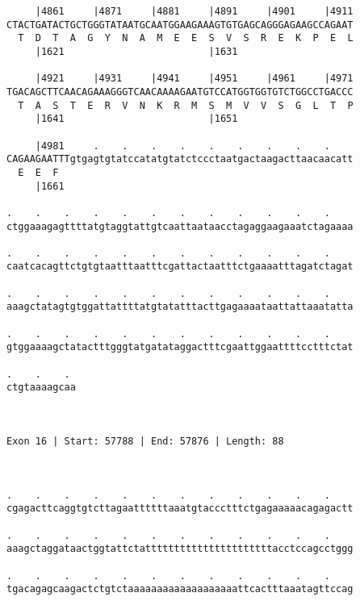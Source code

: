 \documentclass{article}
\begin{document}
\begin{Verbatim}
     |4861     |4871     |4881     |4891     |4901     |4911
CTACTGATACTGCTGGGTATAATGCAATGGAAGAAAGTGTGAGCAGGGAGAAGCCAGAAT
  T  D  T  A  G  Y  N  A  M  E  E  S  V  S  R  E  K  P  E  L
     |1621                         |1631                    
  
     |4921     |4931     |4941     |4951     |4961     |4971
TGACAGCTTCAACAGAAAGGGTCAACAAAAGAATGTCCATGGTGGTGTCTGGCCTGACCC
  T  A  S  T  E  R  V  N  K  R  M  S  M  V  V  S  G  L  T  P
     |1641                         |1651                    
  
     |4981     .    .    .    .    .    .    .    .    .    
CAGAAGAATTTgtgagtgtatccatatgtatctccctaatgactaagacttaacaacatt
  E  E  F                                                   
     |1661                                                  
  
.    .    .    .    .    .    .    .    .    .    .    .    
ctggaaagagttttatgtaggtattgtcaattaataacctagaggaagaaatctagaaaa
                                                            
.    .    .    .    .    .    .    .    .    .    .    .    
caatcacagttctgtgtaatttaatttcgattactaatttctgaaaatttagatctagat
                                                            
.    .    .    .    .    .    .    .    .    .    .    .    
aaagctatagtgtggattattttatgtatatttacttgagaaaataattattaaatatta
                                                            
.    .    .    .    .    .    .    .    .    .    .    .    
gtggaaaagctatactttgggtatgatataggactttcgaattggaattttcctttctat
                                                            
.    .    . 
ctgtaaaagcaa
            
            
 
Exon 16 | Start: 57788 | End: 57876 | Length: 88



.    .    .    .    .    .    .    .    .    .    .    .    
cgagacttcaggtgtcttagaattttttaaatgtaccctttctgagaaaaacagagactt
                                                            
.    .    .    .    .    .    .    .    .    .    .    .    
aaagctaggataactggtattctattttttttttttttttttttttacctccagcctggg
                                                            
.    .    .    .    .    .    .    .    .    .    .    .    
tgacagagcaagactctgtctaaaaaaaaaaaaaaaaaaattcactttaaatagttccag
                                                            

\end{Verbatim}
\end{document}
